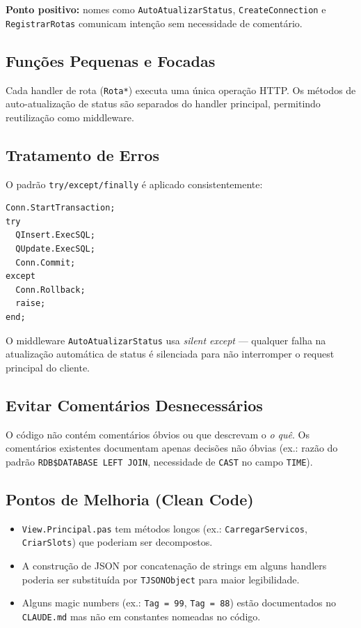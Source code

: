 \documentclass[12pt,a4paper]{article}
\begin{document}
\textbf{Ponto positivo:} nomes como \texttt{AutoAtualizarStatus}, \texttt{CreateConnection} e \texttt{RegistrarRotas} comunicam intenção sem necessidade de comentário.

\subsection{Funções Pequenas e Focadas}

Cada handler de rota (\texttt{Rota*}) executa uma única operação HTTP. Os métodos de auto-atualização de status são separados do handler principal, permitindo reutilização como middleware.

\subsection{Tratamento de Erros}

O padrão \texttt{try/except/finally} é aplicado consistentemente:

\begin{lstlisting}[caption={Padrão de tratamento de erros com transação}]
Conn.StartTransaction;
try
  QInsert.ExecSQL;
  QUpdate.ExecSQL;
  Conn.Commit;
except
  Conn.Rollback;
  raise;
end;
\end{lstlisting}

O middleware \texttt{AutoAtualizarStatus} usa \textit{silent except} — qualquer falha na atualização automática de status é silenciada para não interromper o request principal do cliente.

\subsection{Evitar Comentários Desnecessários}

O código não contém comentários óbvios ou que descrevam o \textit{o quê}. Os comentários existentes documentam apenas decisões não óbvias (ex.: razão do padrão \texttt{RDB\$DATABASE LEFT JOIN}, necessidade de \texttt{CAST} no campo \texttt{TIME}).

\subsection{Pontos de Melhoria (Clean Code)}

\begin{itemize}
  \item \texttt{View.Principal.pas} tem métodos longos (ex.: \texttt{CarregarServicos}, \texttt{CriarSlots}) que poderiam ser decompostos.
  \item A construção de JSON por concatenação de strings em alguns handlers poderia ser substituída por \texttt{TJSONObject} para maior legibilidade.
  \item Alguns magic numbers (ex.: \texttt{Tag = 99}, \texttt{Tag = 88}) estão documentados no \texttt{CLAUDE.md} mas não em constantes nomeadas no código.
\end{itemize}
\end{document}

